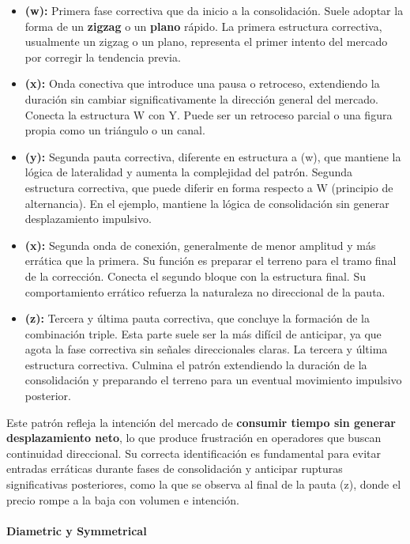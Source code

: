 \begin{itemize}
    \item \textbf{(w):} Primera fase correctiva que da inicio a la consolidaci\'on. Suele adoptar la forma de un \textbf{zigzag} o un \textbf{plano} r\'apido. La primera estructura correctiva, usualmente un zigzag o un plano, representa el primer intento del mercado por corregir la tendencia previa.   
    \item \textbf{(x):} Onda conectiva que introduce una pausa o retroceso, extendiendo la duraci\'on sin cambiar significativamente la direcci\'on general del mercado. Conecta la estructura W con Y. Puede ser un retroceso parcial o una figura propia como un tri\'angulo o un canal.
    \item \textbf{(y):} Segunda pauta correctiva, diferente en estructura a (w), que mantiene la l\'ogica de lateralidad y aumenta la complejidad del patr\'on. Segunda estructura correctiva, que puede diferir en forma respecto a W (principio de alternancia). En el ejemplo, mantiene la l\'ogica de consolidaci\'on sin generar desplazamiento impulsivo.
    \item \textbf{(x):} Segunda onda de conexi\'on, generalmente de menor amplitud y m\'as err\'atica que la primera. Su funci\'on es preparar el terreno para el tramo final de la correcci\'on. Conecta el segundo bloque con la estructura final. Su comportamiento err\'atico refuerza la naturaleza no direccional de la pauta.
    \item \textbf{(z):} Tercera y \'ultima pauta correctiva, que concluye la formaci\'on de la combinaci\'on triple. Esta parte suele ser la m\'as dif\'icil de anticipar, ya que agota la fase correctiva sin se\~nales direccionales claras. La tercera y \'ultima estructura correctiva. Culmina el patr\'on extendiendo la duraci\'on de la consolidaci\'on y preparando el terreno para un eventual movimiento impulsivo posterior.
\end{itemize}

\noindent
Este patr\'on refleja la intenci\'on del mercado de \textbf{consumir tiempo sin generar desplazamiento neto}, lo que produce frustraci\'on en operadores que buscan continuidad direccional. Su correcta identificaci\'on es fundamental para evitar entradas err\'aticas durante fases de consolidaci\'on y anticipar rupturas significativas posteriores, como la que se observa al final de la pauta (z), donde el precio rompe a la baja con volumen e intenci\'on.


\paragraph{Diametric y Symmetrical~\cite{Neely04}}

